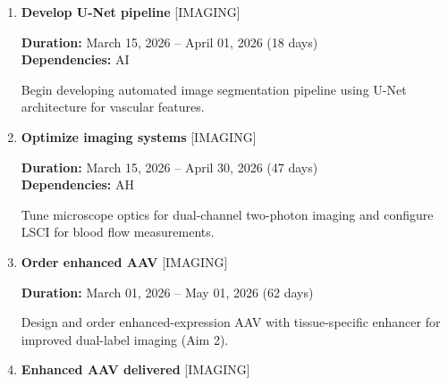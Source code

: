 \documentclass[landscape,a4paper]{article}
\begin{document}
\begin{enumerate}[leftmargin=1.5cm, itemsep=1em, parsep=0.5em]
    \item \textcolor{other}{\textbf{\large Develop U-Net pipeline}}
          \hfill \textcolor{black!60}{\small [IMAGING]}
          
          \vspace{0.2em}
          \textcolor{black!70}{\textbf{Duration:} March 15, 2026 -- April 01, 2026 (18 days)}
          \\[0.2em]\textcolor{black!70}{\textbf{Dependencies:} AI}\n
          \vspace{0.4em}
          \begin{minipage}[t]{0.9\textwidth}
          \textcolor{black!85}{Begin developing automated image segmentation pipeline using U-Net architecture for vascular features.}
          \end{minipage}

    \item \textcolor{other}{\textbf{\large Optimize imaging systems}}
          \hfill \textcolor{black!60}{\small [IMAGING]}
          
          \vspace{0.2em}
          \textcolor{black!70}{\textbf{Duration:} March 15, 2026 -- April 30, 2026 (47 days)}
          \\[0.2em]\textcolor{black!70}{\textbf{Dependencies:} AH}\n
          \vspace{0.4em}
          \begin{minipage}[t]{0.9\textwidth}
          \textcolor{black!85}{Tune microscope optics for dual-channel two-photon imaging and configure LSCI for blood flow measurements.}
          \end{minipage}

    \item \textcolor{other}{\textbf{\large Order enhanced AAV}}
          \hfill \textcolor{black!60}{\small [IMAGING]}
          
          \vspace{0.2em}
          \textcolor{black!70}{\textbf{Duration:} March 01, 2026 -- May 01, 2026 (62 days)}

          \vspace{0.4em}
          \begin{minipage}[t]{0.9\textwidth}
          \textcolor{black!85}{Design and order enhanced-expression AAV with tissue-specific enhancer for improved dual-label imaging (Aim 2).}
          \end{minipage}

    \item \textcolor{other}{\textbf{\large Enhanced AAV delivered}}
          \hfill \textcolor{black!60}{\small [IMAGING]}
          

\end{enumerate}
\end{document}
